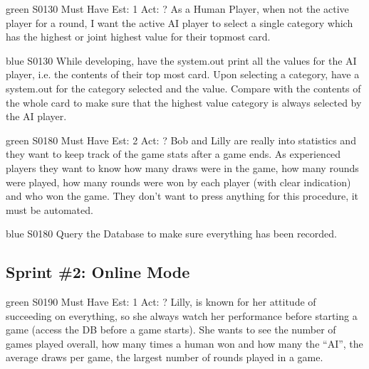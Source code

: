 
\newpage

\begin{card}{green}
{S0130}
{Must Have}
{Est: 1}
{Act: ?}
As a Human Player, when not the active player for a round, I want the active AI player to select a single category which has the highest or joint highest value for their topmost card.
\end{card}

\begin{card}{blue}
{S0130}{}{}{}
While developing, have the system.out print all the values for the AI player, i.e. the contents of their top most card. 
Upon selecting a category, have a system.out for the category selected and the value. 
Compare with the contents of the whole card to make sure that the highest value category is always selected by the AI player.
\end{card}


\newpage

\begin{card}{green}
{S0180}
{Must Have}
{Est: 2}
{Act: ?}
Bob and Lilly are really into statistics and they want to keep track of the game stats after a game ends. 
As experienced players they want to know how many draws were in the game, how many rounds were played, how many rounds were won by each player (with clear indication) and who won the game. 
They don't want to press anything for this procedure, it must be automated.
\end{card}

\begin{card}{blue}
{S0180}{}{}{}
Query the Database to make sure everything has been recorded.
\end{card}


\newpage
\subsection{Sprint \#2: Online Mode}
\label{appendix:user_stories_online}
\bigskip

\begin{card}{green}
{S0190}
{Must Have}
{Est: 1}
{Act: ?}
Lilly, is known for her attitude of succeeding on everything, so she always watch her performance before starting a game (access the DB before a game starts). 
She wants to see the number of games played overall, how many times a human won and how many the ``AI'', the average draws per game, the largest number of rounds played in a game.
\end{card}

